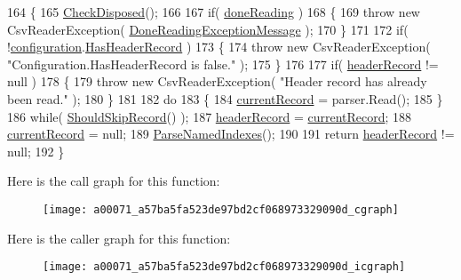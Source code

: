 \begin{DoxyCode}
164         \{
165             \hyperlink{a00071_a6fa45a46ed1322dc1872ca2321b5edbc}{CheckDisposed}();
166 
167             \textcolor{keywordflow}{if}( \hyperlink{a00071_a04a4a668ae50f5383cdd2a1691bbd718}{doneReading} )
168             \{
169                 \textcolor{keywordflow}{throw} \textcolor{keyword}{new} CsvReaderException( \hyperlink{a00071_abea2bd0359f517019984de31f9d9fb96}{DoneReadingExceptionMessage} );
170             \}
171 
172             \textcolor{keywordflow}{if}( !\hyperlink{a00071_a695622911e45cbac8d67dcbd9a3e2967}{configuration}.\hyperlink{a00057_a9e439f90bfac500d24d6e2e731240439}{HasHeaderRecord} )
173             \{
174                 \textcolor{keywordflow}{throw} \textcolor{keyword}{new} CsvReaderException( \textcolor{stringliteral}{"Configuration.HasHeaderRecord is false."} );
175             \}
176 
177             \textcolor{keywordflow}{if}( \hyperlink{a00071_aa6e5fd8aa2961442ca1caf7a4ac54d65}{headerRecord} != null )
178             \{
179                 \textcolor{keywordflow}{throw} \textcolor{keyword}{new} CsvReaderException( \textcolor{stringliteral}{"Header record has already been read."} );
180             \}
181 
182             \textcolor{keywordflow}{do}
183             \{
184                 \hyperlink{a00071_ab2bfef15784add66e441c9d3a0d73751}{currentRecord} = parser.Read();
185             \}
186             \textcolor{keywordflow}{while}( \hyperlink{a00071_a3b8db0163b61e20d56ed8626e21338d6}{ShouldSkipRecord}() );
187             \hyperlink{a00071_aa6e5fd8aa2961442ca1caf7a4ac54d65}{headerRecord} = \hyperlink{a00071_ab2bfef15784add66e441c9d3a0d73751}{currentRecord};
188             \hyperlink{a00071_ab2bfef15784add66e441c9d3a0d73751}{currentRecord} = null;
189             \hyperlink{a00071_afc1150ed2f9ed7c9e87238e65a5e12e9}{ParseNamedIndexes}();
190 
191             \textcolor{keywordflow}{return} \hyperlink{a00071_aa6e5fd8aa2961442ca1caf7a4ac54d65}{headerRecord} != null;
192         \}
\end{DoxyCode}


Here is the call graph for this function\-:
\nopagebreak
\begin{figure}[H]
\begin{center}
\leavevmode
\texttt{[image: a00071\_a57ba5fa523de97bd2cf068973329090d\_cgraph]}
\end{center}
\end{figure}




Here is the caller graph for this function\-:
\nopagebreak
\begin{figure}[H]
\begin{center}
\leavevmode
\texttt{[image: a00071\_a57ba5fa523de97bd2cf068973329090d\_icgraph]}
\end{center}
\end{figure}


